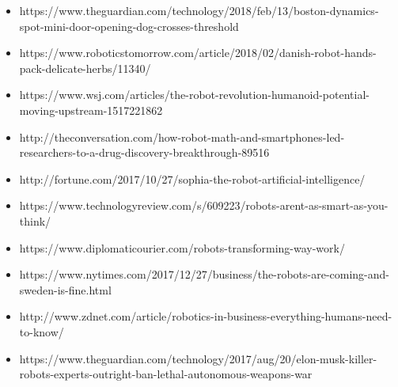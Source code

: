 \begin{itemize}
\item https://www.theguardian.com/technology/2018/feb/13/boston-dynamics-spot-mini-door-opening-dog-crosses-threshold

\item https://www.roboticstomorrow.com/article/2018/02/danish-robot-hands-pack-delicate-herbs/11340/

\item https://www.wsj.com/articles/the-robot-revolution-humanoid-potential-moving-upstream-1517221862

\item http://theconversation.com/how-robot-math-and-smartphones-led-researchers-to-a-drug-discovery-breakthrough-89516

\item http://fortune.com/2017/10/27/sophia-the-robot-artificial-intelligence/

\item https://www.technologyreview.com/s/609223/robots-arent-as-smart-as-you-think/

\item https://www.diplomaticourier.com/robots-transforming-way-work/

\item https://www.nytimes.com/2017/12/27/business/the-robots-are-coming-and-sweden-is-fine.html

\item http://www.zdnet.com/article/robotics-in-business-everything-humans-need-to-know/

\item https://www.theguardian.com/technology/2017/aug/20/elon-musk-killer-robots-experts-outright-ban-lethal-autonomous-weapons-war

\end{itemize}

